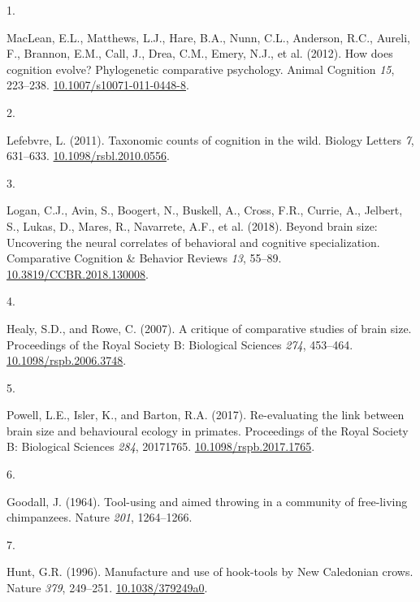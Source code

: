 \documentclass[
  man, donotrepeattitle,floatsintext]{apa6}
\newlength{\cslhangindent}
\newlength{\csllabelwidth}
\newlength{\cslentryspacingunit} %
\newenvironment{CSLReferences}[2] %
 {%
  \setlength{\parindent}{0pt}
  \ifodd #1
  \let\oldpar\par
  \def\par{\hangindent=\cslhangindent\oldpar}
  \fi
  \setlength{\parskip}{#2\cslentryspacingunit}
 }%
 {}
\newcommand{\CSLLeftMargin}[1]{\parbox[t]{\csllabelwidth}{#1}}
\newcommand{\CSLRightInline}[1]{\parbox[t]{\linewidth - \csllabelwidth}{#1}\break}
\begin{document}
\hypertarget{refs}{}
\begin{CSLReferences}{0}{0}
\leavevmode{}%
\CSLLeftMargin{1. }%
\CSLRightInline{MacLean, E.L., Matthews, L.J., Hare, B.A., Nunn, C.L., Anderson, R.C., Aureli, F., Brannon, E.M., Call, J., Drea, C.M., Emery, N.J., et al. (2012). How does cognition evolve? Phylogenetic comparative psychology. Animal Cognition \emph{15}, 223--238. \href{https://doi.org/10.1007/s10071-011-0448-8}{10.1007/s10071-011-0448-8}.}

\leavevmode{}%
\CSLLeftMargin{2. }%
\CSLRightInline{Lefebvre, L. (2011). Taxonomic counts of cognition in the wild. Biology Letters \emph{7}, 631--633. \href{https://doi.org/10.1098/rsbl.2010.0556}{10.1098/rsbl.2010.0556}.}

\leavevmode{}%
\CSLLeftMargin{3. }%
\CSLRightInline{Logan, C.J., Avin, S., Boogert, N., Buskell, A., Cross, F.R., Currie, A., Jelbert, S., Lukas, D., Mares, R., Navarrete, A.F., et al. (2018). Beyond brain size: Uncovering the neural correlates of behavioral and cognitive specialization. Comparative Cognition \& Behavior Reviews \emph{13}, 55--89. \href{https://doi.org/10.3819/CCBR.2018.130008}{10.3819/CCBR.2018.130008}.}

\leavevmode{}%
\CSLLeftMargin{4. }%
\CSLRightInline{Healy, S.D., and Rowe, C. (2007). A critique of comparative studies of brain size. Proceedings of the Royal Society B: Biological Sciences \emph{274}, 453--464. \href{https://doi.org/10.1098/rspb.2006.3748}{10.1098/rspb.2006.3748}.}

\leavevmode{}%
\CSLLeftMargin{5. }%
\CSLRightInline{Powell, L.E., Isler, K., and Barton, R.A. (2017). Re-evaluating the link between brain size and behavioural ecology in primates. Proceedings of the Royal Society B: Biological Sciences \emph{284}, 20171765. \href{https://doi.org/10.1098/rspb.2017.1765}{10.1098/rspb.2017.1765}.}

\leavevmode{}%
\CSLLeftMargin{6. }%
\CSLRightInline{Goodall, J. (1964). Tool-using and aimed throwing in a community of free-living chimpanzees. Nature \emph{201}, 1264--1266.}

\leavevmode{}%
\CSLLeftMargin{7. }%
\CSLRightInline{Hunt, G.R. (1996). Manufacture and use of hook-tools by {N}ew {C}aledonian crows. Nature \emph{379}, 249--251. \href{https://doi.org/10.1038/379249a0}{10.1038/379249a0}.}


\end{CSLReferences}
\end{document}
